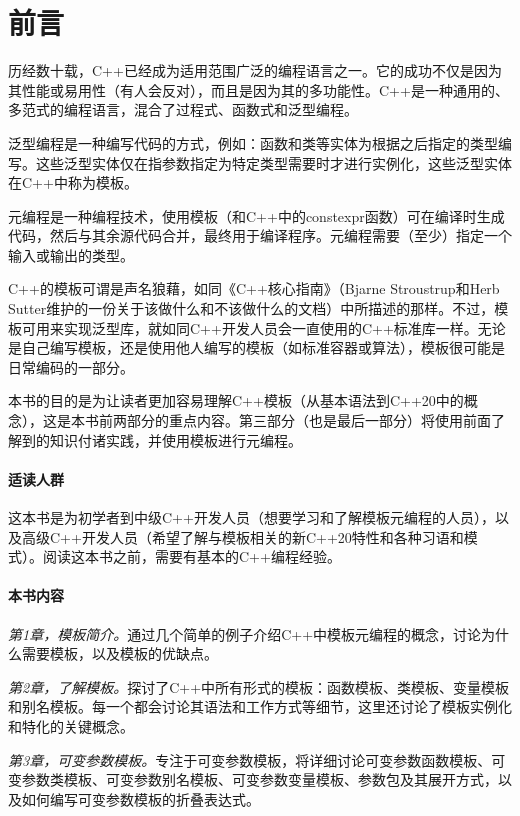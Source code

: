 \chapter{前言}

历经数十载，C++已经成为适用范围广泛的编程语言之一。它的成功不仅是因为其性能或易用性（有人会反对），而且是因为其的多功能性。C++是一种通用的、多范式的编程语言，混合了过程式、函数式和泛型编程。

泛型编程是一种编写代码的方式，例如：函数和类等实体为根据之后指定的类型编写。这些泛型实体仅在指参数指定为特定类型需要时才进行实例化，这些泛型实体在C++中称为模板。

元编程是一种编程技术，使用模板（和C++中的constexpr函数）可在编译时生成代码，然后与其余源代码合并，最终用于编译程序。元编程需要（至少）指定一个输入或输出的类型。

C++的模板可谓是声名狼藉，如同《C++核心指南》（Bjarne Stroustrup和Herb Sutter维护的一份关于该做什么和不该做什么的文档）中所描述的那样。不过，模板可用来实现泛型库，就如同C++开发人员会一直使用的C++标准库一样。无论是自己编写模板，还是使用他人编写的模板（如标准容器或算法），模板很可能是日常编码的一部分。

本书的目的是为让读者更加容易理解C++模板（从基本语法到C++20中的概念），这是本书前两部分的重点内容。第三部分（也是最后一部分）将使用前面了解到的知识付诸实践，并使用模板进行元编程。

\subsubsection{适读人群}

这本书是为初学者到中级C++开发人员（想要学习和了解模板元编程的人员），以及高级C++开发人员（希望了解与模板相关的新C++20特性和各种习语和模式）。阅读这本书之前，需要有基本的C++编程经验。

\subsubsection{本书内容}

\textit{第1章，模板简介。}通过几个简单的例子介绍C++中模板元编程的概念，讨论为什么需要模板，以及模板的优缺点。

\textit{第2章，了解模板。}探讨了C++中所有形式的模板：函数模板、类模板、变量模板和别名模板。每一个都会讨论其语法和工作方式等细节，这里还讨论了模板实例化和特化的关键概念。

\textit{第3章，可变参数模板。}专注于可变参数模板，将详细讨论可变参数函数模板、可变参数类模板、可变参数别名模板、可变参数变量模板、参数包及其展开方式，以及如何编写可变参数模板的折叠表达式。

